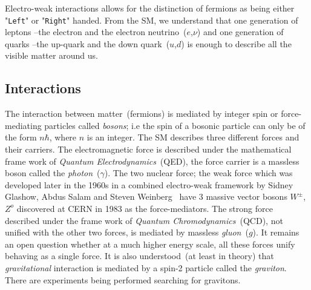 
Electro-weak interactions allows for the distinction of fermions as being either "\texttt{Left}" or "\texttt{Right}" handed.  
From the SM, we understand that one generation of leptons --the electron and the electron neutrino~($e$,$\nu$) and one generation of quarks --the up-quark and the down quark~($u$,$d$) is enough to describe all the visible matter around us.
\subsection*{Interactions}
The interaction between matter~(fermions) is mediated by integer spin or force-mediating particles called \textit{bosons}; i.e the spin of a bosonic particle can only be of the form $n\hbar$, where $n$ is an integer. The SM describes three different forces and their carriers. The electromagnetic force is described under the mathematical frame work of \textit{Quantum Electrodynamics}~(QED), the force carrier is a massless boson called the \textit{photon}~($\gamma$). The two nuclear force; the weak force which was developed later in the 1960s in a combined electro-weak framework by Sidney Glashow, Abdus Salam and Steven Weinberg~\cite{SM} have 3 massive vector bosons $W^{\pm}$, $Z^{o}$ discovered at CERN in 1983 as the force-mediators. The strong force described under the frame work of \textit{Quantum Chromodynamics}~(QCD), not unified with the other two forces, is mediated by massless \textit{gluon}~($g$).  It remains an open question whether at a much higher energy scale, all these forces unify behaving as a single force. It is also understood~(at least in theory) that \textit{gravitational} interaction is mediated by a spin-2 particle called the \textit{graviton}. There are experiments being performed searching  for gravitons.



